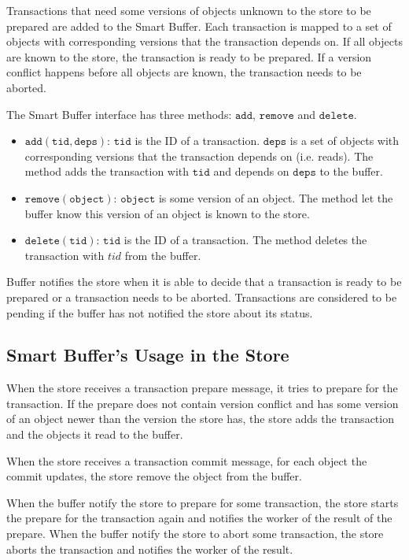 \documentclass{article}
\begin{document}
Transactions that need some versions of objects unknown to
the store to be prepared are added to the Smart Buffer. Each transaction is mapped 
to a set of objects with corresponding versions that the transaction depends on. 
If all objects are known to the store, the transaction is ready to be prepared. 
If a version conflict happens before all objects are known, the transaction needs 
to be aborted.

The Smart Buffer interface has three methods: $\mathtt{add}$, $\mathtt{remove}$
and $\mathtt{delete}$.
\begin{itemize}
  \item $\mathtt{add(tid, deps)}$: $\mathtt{tid}$ is the ID of a transaction.
  $\mathtt{deps}$ is a set of objects with corresponding versions that the
  transaction depends on (i.e. reads). The method adds the transaction with
  $\mathtt{tid}$ and depends on $\mathtt{deps}$ to the buffer.
  \item $\mathtt{remove(object)}$: $\mathtt{object}$ is some version of an
  object. The method let the buffer know this version of an object is known to
  the store.
  \item $\mathtt{delete(tid)}$: $\mathtt{tid}$ is the ID of a transaction. The
  method deletes the transaction with $tid$ from the buffer.
\end{itemize}
Buffer notifies the store when it is able to decide that a transaction is ready to be
prepared or a transaction needs to be aborted. Transactions are considered to be 
pending if the buffer has not notified the store about its status. 

\subsection{Smart Buffer's Usage in the Store}
When the store receives a transaction prepare message, it tries to prepare for
the transaction. If the prepare does not contain version conflict and has some
version of an object newer than the version the store has, the store adds the
transaction and the objects it read to the buffer. 

When the store receives a transaction commit message, for each object the commit
updates, the store remove the object from the buffer. 

When the buffer notify the store to prepare for some transaction, the store
starts the prepare for the transaction again and notifies the worker of the
result of the prepare. When the buffer notify the store to abort some
transaction, the store aborts the transaction and notifies the worker of the
result.
\end{document}
